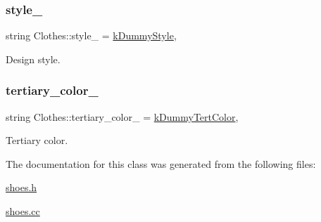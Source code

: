 \subsubsection{\texorpdfstring{style\+\_\+}{style\_}}
{\footnotesize\ttfamily string Clothes\+::style\+\_\+ = \mbox{\hyperlink{clothes_8h_a9deec6ed1f40928bfa0040eeab95ed6b}{k\+Dummy\+Style}}\hspace{0.3cm}{\ttfamily [protected]}, {\ttfamily [inherited]}}



Design style. 

\mbox{\label{classClothes_a3c5f1e7ab531e3ba7a38b930da8078a0}} 
\subsubsection{\texorpdfstring{tertiary\+\_\+color\+\_\+}{tertiary\_color\_}}
{\footnotesize\ttfamily string Clothes\+::tertiary\+\_\+color\+\_\+ = \mbox{\hyperlink{clothes_8h_a094dde85547895fd70dafb3ab10c6783}{k\+Dummy\+Tert\+Color}}\hspace{0.3cm}{\ttfamily [protected]}, {\ttfamily [inherited]}}



Tertiary color. 



The documentation for this class was generated from the following files\+:\begin{DoxyCompactItemize}
\item 
\mbox{\hyperlink{shoes_8h}{shoes.\+h}}\item 
\mbox{\hyperlink{shoes_8cc}{shoes.\+cc}}\end{DoxyCompactItemize}
